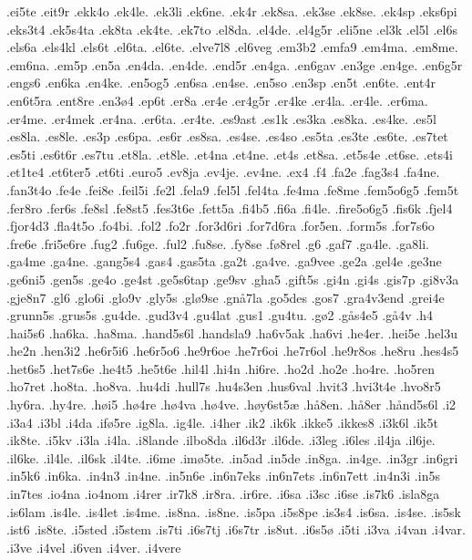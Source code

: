 {.ei5te
.eit9r
.ekk4o
.ek4le.
.ek3li
.ek6ne.
.ek4r
.ek8sa.
.ek3se
.ek8se.
.ek4sp
.eks6pi
.eks3t4
.ek5s4ta
.ek8ta
.ek4te.
.ek7to
.el8da.
.el4de.
.el4g5r
.eli5ne
.el3k
.el5l
.el6s
.els6a
.els4kl
.els6t
.el6ta.
.el6te.
.elve7l8
.el6veg
.em3b2
.emfa9
.em4ma.
.em8me.
.em6na.
.em5p
.en5a
.en4da.
.en4de.
.end5r
.en4ga.
.en6gav
.en3ge
.en4ge.
.en6g5r
.engs6
.en6ka
.en4ke.
.en5og5
.en6sa
.en4se.
.en5so
.en3sp
.en5t
.en6te.
.ent4r
.en6t5ra
.ent8re
.en3ø4
.ep6t
.er8a
.er4e
.er4g5r
.er4ke
.er4la.
.er4le.
.er6ma.
.er4me.
.er4mek
.er4na.
.er6ta.
.er4te.
.es9ast
.es1k
.es3ka
.es8ka.
.es4ke.
.es5l
.es8la.
.es8le.
.es3p
.es6pa.
.es6r
.es8sa.
.es4se.
.es4so
.es5ta
.es3te
.es6te.
.es7tet
.es5ti
.es6t6r
.es7tu
.et8la.
.et8le.
.et4na
.et4ne.
.et4s
.et8sa.
.et5s4e
.et6se.
.ets4i
.et1te4
.et6ter5
.et6ti
.euro5
.ev8ja
.ev4je.
.ev4ne.
.ex4
.f4
.fa2e
.fag3s4
.fa4ne.
.fan3t4o
.fe4e
.fei8e
.feil5i
.fe2l
.fela9
.fel5l
.fel4ta
.fe4ma
.fe8me
.fem5o6g5
.fem5t
.fer8ro
.fer6s
.fe8sl
.fe8st5
.fes3t6e
.fett5a
.fi4b5
.fi6a
.fi4le.
.fire5o6g5
.fis6k
.fjel4
.fjor4d3
.fla4t5o
.fo4bi.
.fol2
.fo2r
.for3d6ri
.for7d6ra
.for5en.
.form5s
.for7s6o
.fre6e
.fri5e6re
.fug2
.fu6ge.
.ful2
.fu8se.
.fy8se
.fø8rel
.g6
.gaf7
.ga4le.
.ga8li.
.ga4me
.ga4ne.
.gang5s4
.gas4
.gas5ta
.ga2t
.ga4ve.
.ga9vee
.ge2a
.gel4e
.ge3ne
.ge6ni5
.gen5s
.ge4o
.ge4st
.ge5s6tap
.ge9sv
.gha5
.gift5s
.gi4n
.gi4s
.gis7p
.gi8v3a
.gje8n7
.gl6
.glo6i
.glo9v
.gly5s
.glø9se
.gnå7la
.go5des
.gos7
.gra4v3end
.grei4e
.grunn5s
.grus5s
.gu4de.
.gud3v4
.gu4lat
.gus1
.gu4tu.
.gø2
.gås4e5
.gå4v
.h4
.hai5s6
.ha6ka.
.ha8ma.
.hand5s6l
.handsla9
.ha6v5ak
.ha6vi
.he4er.
.hei5e
.hel3u
.he2n
.hen3i2
.he6r5i6
.he6r5o6
.he9r6oe
.he7r6oi
.he7r6ol
.he9r8os
.he8ru
.hes4s5
.het6s5
.het7s6e
.he4t5
.he5t6e
.hil4l
.hi4n
.hi6re.
.ho2d
.ho2e
.ho4re.
.ho5ren
.ho7ret
.ho8ta.
.ho8va.
.hu4di
.hull7s
.hu4s3en
.hus6val
.hvit3
.hvi3t4e
.hvo8r5
.hy6ra.
.hy4re.
.høi5
.hø4re
.hø4va
.hø4ve.
.høy6st5æ
.hå8en.
.hå8er
.hånd5s6l
.i2
.i3a4
.i3bl
.i4da
.ifø5re
.ig8la.
.ig4le.
.i4her
.ik2
.ik6k
.ikke5
.ikkes8
.i3k6l
.ik5t
.ik8te.
.i5kv
.i3la
.i4la.
.i8lande
.ilbo8da
.il6d3r
.il6de.
.i3leg
.i6les
.il4ja
.il6je.
.il6ke.
.il4le.
.il6sk
.il4te.
.i6me
.imø5te.
.in5ad
.in5de
.in8ga.
.in4ge.
.in3gr
.in6gri
.in5k6
.in6ka.
.in4n3
.in4ne.
.in5n6e
.in6n7eks
.in6n7ets
.in6n7ett
.in4n3i
.in5s
.in7tes
.io4na
.io4nom
.i4rer
.ir7k8
.ir8ra.
.ir6re.
.i6sa
.i3sc
.i6se
.is7k6
.isla8ga
.is6lam
.is4le.
.is4let
.is4me.
.is8na.
.is8ne.
.is5pa
.i5s8pe
.is3s4
.is6sa.
.is4se.
.is5sk
.ist6
.is8te.
.i5sted
.i5stem
.is7ti
.i6s7tj
.i6s7tr
.is8ut.
.i6s5ø
.i5ti
.i3va
.i4van
.i4var.
.i3ve
.i4vel
.i6ven
.i4ver.
.i4vere
}
